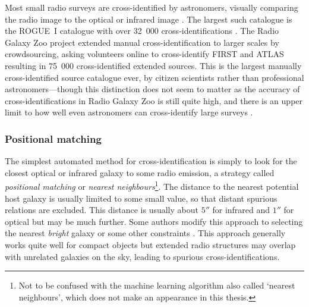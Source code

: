 \documentclass[11pt, a4paper]{book}
\newcommand{\defn}[1]{\emph{#1}}
\begin{document}
        \begin{sloppypar}
        Most small radio surveys are cross-identified by astronomers, visually comparing the radio image to the optical or infrared image \citep[e.g.][]{norris06,middelberg08}. The largest such catalogue is the ROGUE~I catalogue with over 32~000 cross-identifications \citep{zywucka_catalogue_2020}. The Radio Galaxy Zoo project \citep{banfield15} extended manual cross-identification to larger scales by crowdsourcing, asking volunteers online to cross-identify FIRST and ATLAS resulting in 75~000 cross-identified extended sources. This is the largest manually cross-identified source catalogue ever, by citizen scientists rather than professional astronomers---though this distinction does not seem to matter as the accuracy of cross-identifications in Radio Galaxy Zoo is still quite high, and there is an upper limit to how well even astronomers can cross-identify large surveys \citep{wong21rgz,banfield15}.
        \end{sloppypar}

        \subsubsection{Positional matching}
        \label{sec:xid-posmatch}

            The simplest automated method for cross-identification is simply to look for the closest optical or infrared galaxy to some radio emission, a strategy called \defn{positional matching} or \defn{nearest neighbours}\footnote{Not to be confused with the machine learning algorithm also called `nearest neighbours', which does not make an appearance in this thesis.}. The distance to the nearest potential host galaxy is usually limited to some small value, so that distant spurious relations are excluded. This distance is usually about $5''$ for infrared and $1''$ for optical but may be much further. Some authors modify this approach to selecting the nearest \emph{bright} galaxy or some other constraints \citep[e.g.][]{kimball08}. This approach generally works quite well for compact objects but extended radio structures may overlap with unrelated galaxies on the sky, leading to spurious cross-identifications.
\end{document}
